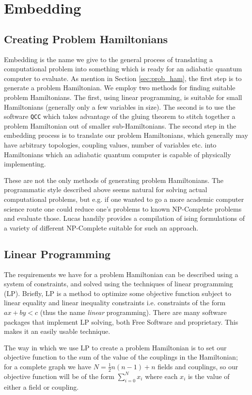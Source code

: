 \chapter{Embedding}
\section{Creating Problem Hamiltonians}
Embedding is the name we give to the general process of translating a computational problem into something which is ready for an adiabatic quantum computer to evaluate.  As mention in Section \ref{sec:prob_ham}, the first step is to generate a problem Hamiltonian.  We employ two methods for finding suitable problem Hamiltonians.  The first, using linear programming, is suitable for small Hamiltonians (generally only a few variables in size).  The second is to use the software \texttt{QCC} which takes advantage of the gluing theorem to stitch together a problem Hamiltonian out of smaller sub-Hamiltonians.
The second step in the embedding process is to translate our problem Hamiltonians, which generally may have arbitrary topologies, coupling values, number of variables etc. into Hamiltonians which an adiabatic quantum computer is capable of physically implementing.

These are not the only methods of generating problem Hamiltonians.  The programmatic style described above seems natural for solving actual computational problems, but e.g. if one wanted to go a more academic computer science route one could reduce one's problems to known NP-Complete problems and evaluate those.  Lucas \cite{lucas} handily provides a compilation of ising formulations of a variety of different NP-Complete suitable for such an approach.

\section{Linear Programming}
The requirements we have for a problem Hamiltonian can be described using a system of constraints, and solved using the techniques of linear programming (LP).
Briefly, LP is a method to optimize some objective function subject to linear equality and linear inequality constraints i.e. constraints of the form $ax + by < c$ (thus the name \emph{linear} programming).  There are many software packages that implement LP solving, both Free Software and proprietary.  This makes it an easily usable technique.

The way in which we use LP to create a problem Hamiltonian is to set our objective function to the sum of the value of the couplings in the Hamiltonian; for a complete graph we have $N = \frac{1}{2}n(n-1) + n$ fields and couplings, so our objective function will be of the form $\sum_{i=0}^N x_i$ where each $x_i$ is the value of either a field or coupling.

